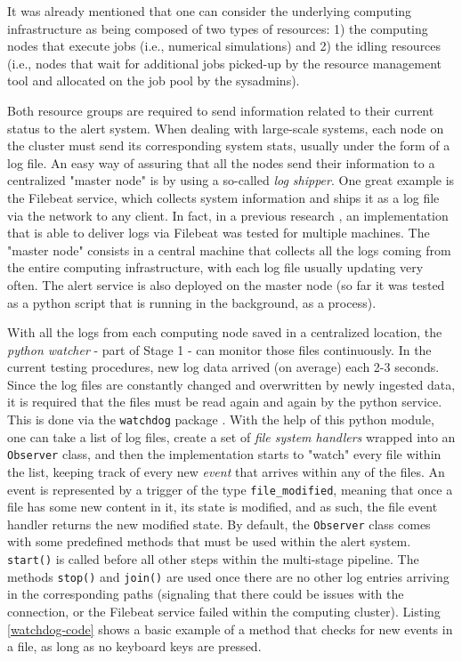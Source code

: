 \documentclass[conference]{IEEEtran}
\begin{document}
It was already mentioned that one can consider the underlying computing infrastructure as being composed of two types of resources: 1) the computing nodes that execute jobs (i.e., numerical simulations) and 2) the idling resources (i.e., nodes that wait for additional jobs picked-up by the resource management tool and allocated on the job pool by the sysadmins).
\par Both resource groups are required to send information related to their current status to the alert system. When dealing with large-scale systems, each node on the cluster must send its corresponding system stats, usually under the form of a log file. An easy way of assuring that all the nodes send their information to a centralized "master node" is by using a so-called \emph{log shipper}. One great example is the Filebeat \cite{filebeat} service, which collects system information and ships it as a log file via the network to any client. In fact, in a previous research \cite{poenaru-elk}, an implementation that is able to deliver logs via Filebeat was tested for multiple machines. The "master node" consists in a central machine that collects all the logs coming from the entire computing infrastructure, with each log file usually updating very often. The alert service is also deployed on the master node (so far it was tested as a python script that is running in the background, as a process).
\par With all the logs from each computing node saved in a centralized location, the \emph{python watcher} - part of Stage 1 - can monitor those files continuously. In the current testing procedures, new log data arrived (on average) each 2-3 seconds. Since the log files are constantly changed and overwritten by newly ingested data, it is required that the files must be read again and again by the python service. This is done via the \texttt{watchdog} package \cite{watchdog}. With the help of this python module, one can take a list of log files, create a set of \emph{file system handlers} wrapped into an \texttt{Observer} class, and then the implementation starts to "watch" every file within the list, keeping track of every new \emph{event} that arrives within any of the files. An event is represented by a trigger of the type \texttt{file\_modified}, meaning that once a file has some new content in it, its state is modified, and as such, the file event handler returns the new modified state. By default, the \texttt{Observer} class comes with some predefined methods that must be used within the alert system. \texttt{start()} is called before all other steps within the multi-stage pipeline. The methods \texttt{stop()} and \texttt{join()} are used once there are no other log entries arriving in the corresponding paths (signaling that there could be issues with the connection, or the Filebeat service failed within the computing cluster). Listing \ref{watchdog-code} shows a basic example of a method that checks for new events in a file, as long as no keyboard keys are pressed.
\end{document}
